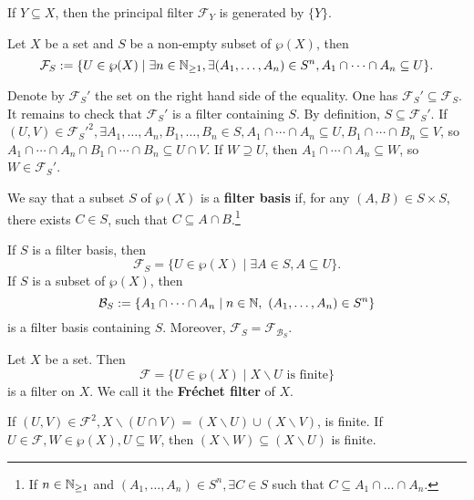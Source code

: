 \begin{remark}
    If $Y\subseteq X$, then the principal filter $\mathcal{ F}_Y$ is generated by $\{Y\}$.
\end{remark}
\begin{propositionenv}
    Let $X$ be a set and $S$ be a non-empty subset of  $\wp(X)$, then 
    $$\mathcal{F}_S:=\{U\in \wp(X)\mid \exists n\in \mathbb{N}_{\ge 1}, \exists(A_1,\dots,A_n)\in S^n, A_1\cap\cdots\cap A_n\subseteq U\}.$$
\end{propositionenv}
\begin{proofenv}
    Denote by $\mathcal{F}_S'$ the set on the right hand side of the equality. One has $\mathcal{F}_S'\subseteq \mathcal{F}_S$. It remains to check that $\mathcal{F}_S'$ is a filter containing $S$. By definition, $S\subseteq \mathcal{F}_S'$. If $(U,V)\in \mathcal{ F}_S'^2, \exists A_1,\dots,A_n,B_1,\dots,B_n\in S, A_1\cap\cdots\cap A_n\subseteq U, B_1\cap\cdots\cap B_n\subseteq V$, so $A_1\cap\cdots\cap A_n\cap B_1\cap\cdots\cap B_n\subseteq U\cap V$. If $W\supseteq U$, then $A_1\cap\cdots\cap A_n\subseteq W$, so $W\in \mathcal{F}_S'$.
\end{proofenv}
\begin{definitionenv}
    We say that a subset $S$ of $\wp(X)$ is a \textbf{filter basis} if, for any $(A,B)\in S\times S$, there exists $C\in S$, such that $C\subseteq A\cap B$.\footnote{If $n\in \mathbb{N}_{\ge 1}$ and $(A_1,\dots,A_n)\in S^n,\exists C\in S$ such that $C\subseteq A_1\cap \dots\cap A_n$.}
\end{definitionenv}
\begin{remark}
    If $S$ is a filter basis, then 
    $$\mathcal{F}_S=\{U\in \wp(X)\mid \exists A\in S, A\subseteq U\}.$$
    If $S$ is a subset of $\wp(X)$, then 
    $$\mathcal{B}_S:=\{A_1\cap \cdots \cap A_n\mid n\in \mathbb{N},\ (A_1,\dots,A_n)\in S^n\}$$
     is a filter basis containing $S$. Moreover, $\mathcal{F}_S=\mathcal{F}_{\mathcal{B}_S}$.
\end{remark}
\begin{propositionenv}
    Let $X$ be a set. Then
    $$\mathcal{F}=\{U\in \wp(X)\mid X\backslash U \text{ is finite}\}$$
    is a filter on $X$. We call it the \textbf{Fréchet filter} of $X$.
\end{propositionenv}
\begin{proofenv}
    \quad
    \newline
    If $(U,V)\in \mathcal{F}^2, X\backslash (U\cap V)=(X\backslash U)\cup (X\backslash V)$, is finite.
    \newline
    If $U\in \mathcal{F}, W\in \wp(X), U\subseteq W$, then $(X\backslash W)\subseteq (X\backslash U)$ is finite.
\end{proofenv}
